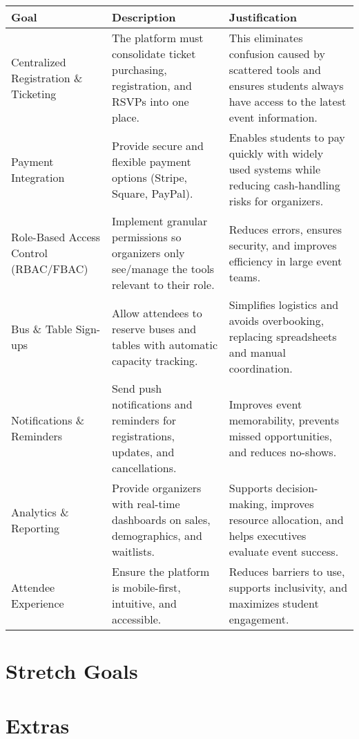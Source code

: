 \documentclass{article}
\begin{document}
\begin{table}[h!]
\small
\begin{tabular}{|p{3cm}|p{5cm}|p{5.5cm}|}
\hline
\textbf{Goal} & \textbf{Description} & \textbf{Justification} \\
\hline
Centralized Registration \& Ticketing & The platform must consolidate ticket purchasing, registration, and RSVPs into one place. & This eliminates confusion caused by scattered tools and ensures students always have access to the latest event information. \\
\hline
Payment Integration & Provide secure and flexible payment options (Stripe, Square, PayPal). & Enables students to pay quickly with widely used systems while reducing cash-handling risks for organizers. \\
\hline
Role-Based Access Control (RBAC/FBAC) & Implement granular permissions so organizers only see/manage the tools relevant to their role. & Reduces errors, ensures security, and improves efficiency in large event teams. \\
\hline
Bus \& Table Sign-ups & Allow attendees to reserve buses and tables with automatic capacity tracking. & Simplifies logistics and avoids overbooking, replacing spreadsheets and manual coordination. \\
\hline
Notifications \& Reminders & Send push notifications and reminders for registrations, updates, and cancellations. & Improves event memorability, prevents missed opportunities, and reduces no-shows. \\
\hline
Analytics \& Reporting & Provide organizers with real-time dashboards on sales, demographics, and waitlists. & Supports decision-making, improves resource allocation, and helps executives evaluate event success. \\
\hline
Attendee Experience & Ensure the platform is mobile-first, intuitive, and accessible. & Reduces barriers to use, supports inclusivity, and maximizes student engagement. \\
\hline
\end{tabular}
\label{tab:requirements}
\end{table}

\section{Stretch Goals}

\section{Extras}
\end{document}
